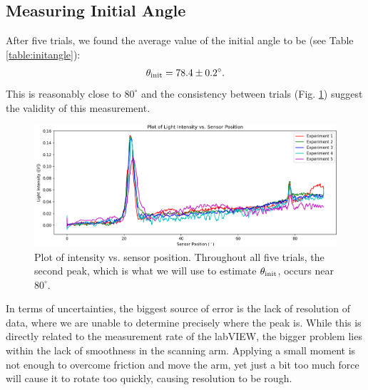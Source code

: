 \documentclass[12pt]{article}
\begin{document}
\subsection{Measuring Initial Angle} \label{sec:initial}
After five trials, we found the average value of the initial angle to be (see Table \ref{table:initangle}):
\begin{equation}
    \theta_{\rm init}=78.4\pm0.2^\circ.
    \label{eq:init}
\end{equation}
This is reasonably close to $80^\circ$ and the consistency between trials (Fig. \ref{fig:initangle}) suggest the validity of this measurement. 

\begin{figure}[htbp]
\centering
\includegraphics[width=1\columnwidth]{figure/initangle.png}
\caption{Plot of intensity vs. sensor position. Throughout all five trials, the second peak, which is what we will use to estimate $\theta_{\rm init}$, occurs near $80^\circ$.}
\label{fig:initangle}
\end{figure}

In terms of uncertainties, the biggest source of error is the lack of resolution of data, where we are unable to determine precisely where the peak is. While this is directly related to the measurement rate of the labVIEW, the bigger problem lies within the lack of smoothness in the scanning arm. Applying a small moment is not enough to overcome friction and move the arm, yet just a bit too much force will cause it to rotate too quickly, causing resolution to be rough.
\end{document}
